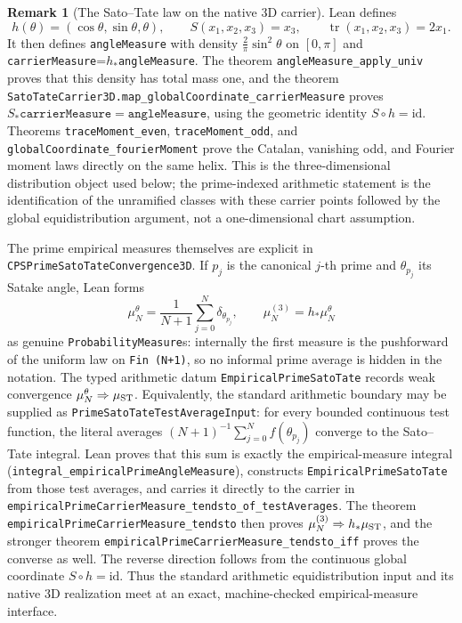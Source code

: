 \documentclass[11pt]{article}
\theoremstyle{definition}
\newtheorem{remark}[theorem]{Remark}
\begin{document}
\medskip
\begin{remark}[The Sato--Tate law on the native 3D carrier]
Lean defines
\[
 h(\theta)=(\cos\theta,\sin\theta,\theta),\qquad
 S(x_1,x_2,x_3)=x_3,\qquad \operatorname{tr}(x_1,x_2,x_3)=2x_1.
\]
It then defines \texttt{angleMeasure} with density
$\frac2\pi\sin^2\theta$ on $[0,\pi]$ and
\texttt{carrierMeasure}=\(h_*\)\texttt{angleMeasure}. The theorem
\texttt{angleMeasure\_apply\_univ} proves that this density has total mass one, and the theorem
\texttt{SatoTateCarrier3D.map\_globalCoordinate\_carrierMeasure} proves
$S_*\texttt{carrierMeasure}=\texttt{angleMeasure}$, using the geometric identity
$S\circ h=\mathrm{id}$. Theorems \texttt{traceMoment\_even},
\texttt{traceMoment\_odd}, and \texttt{globalCoordinate\_fourierMoment} prove the Catalan,
vanishing odd, and Fourier moment laws directly on the same helix. This is the
three-dimensional distribution object used below; the prime-indexed arithmetic statement is the
identification of the unramified classes with these carrier points followed by the global
equidistribution argument, not a one-dimensional chart assumption.

The prime empirical measures themselves are explicit in
\texttt{CPSPrimeSatoTateConvergence3D}.  If $p_j$ is the canonical $j$-th prime and
$\theta_{p_j}$ its Satake angle, Lean forms
\[
 \mu_N^\theta=\frac1{N+1}\sum_{j=0}^{N}\delta_{\theta_{p_j}},
 \qquad
 \mu_N^{(3)}=h_*\mu_N^\theta
\]
as genuine \texttt{ProbabilityMeasure}s: internally the first measure is the pushforward of the
uniform law on \texttt{Fin (N+1)}, so no informal prime average is hidden in the notation.  The
typed arithmetic datum \texttt{EmpiricalPrimeSatoTate} records weak convergence
$\mu_N^\theta\Rightarrow\mu_{\rm ST}$.  Equivalently, the standard arithmetic boundary may be
supplied as \texttt{PrimeSatoTateTestAverageInput}: for every bounded continuous test function,
the literal averages $(N+1)^{-1}\sum_{j=0}^N f(\theta_{p_j})$ converge to the Sato--Tate integral.
Lean proves that this sum is exactly the empirical-measure integral
(\texttt{integral\_empiricalPrimeAngleMeasure}), constructs
\texttt{EmpiricalPrimeSatoTate} from those test averages, and carries it directly to the carrier
in \texttt{empiricalPrimeCarrierMeasure\_tendsto\_of\_testAverages}.  The theorem
\texttt{empiricalPrimeCarrierMeasure\_tendsto} then proves
$\mu_N^{(3)}\Rightarrow h_*\mu_{\rm ST}$, and the stronger theorem
\texttt{empiricalPrimeCarrierMeasure\_tendsto\_iff} proves the converse as well.  The reverse
direction follows from the continuous global coordinate $S\circ h=\mathrm{id}$.  Thus the
standard arithmetic equidistribution input and its native 3D realization meet at an exact,
machine-checked empirical-measure interface.


\end{remark}
\end{document}
